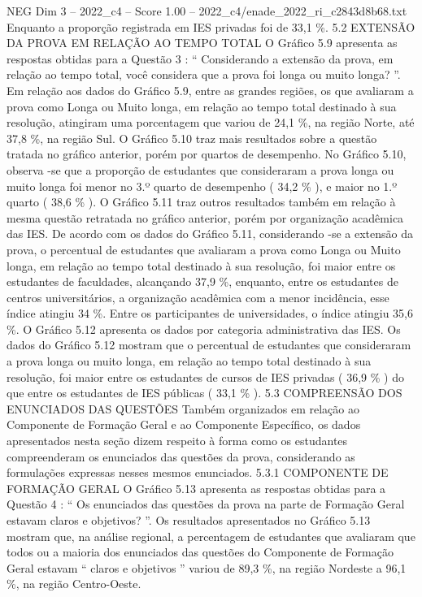 \begin{textsample}{NEG Dim 3 – 2022\_c4 – Score 1.00 – 2022\_c4/enade\_2022\_ri\_c2843d8b68.txt}
Enquanto a proporção registrada em IES privadas foi de 33,1 \%. 5.2 EXTENSÃO DA PROVA EM RELAÇÃO AO TEMPO TOTAL O Gráfico 5.9 apresenta as respostas obtidas para a Questão 3 : “ Considerando a extensão da prova, em relação ao tempo total, você considera que a prova foi longa ou muito longa? ”.
Em relação aos dados do Gráfico 5.9, entre as grandes regiões, os que avaliaram a prova como Longa ou Muito longa, em relação ao tempo total destinado à sua resolução, atingiram uma porcentagem que variou de 24,1 \%, na região Norte, até 37,8 \%, na região Sul.
O Gráfico 5.10 traz mais resultados sobre a questão tratada no gráfico anterior, porém por quartos de desempenho.
No Gráfico 5.10, observa -se que a proporção de estudantes que consideraram a prova longa ou muito longa foi menor no 3.º quarto de desempenho ( 34,2 \% ), e maior no 1.º quarto ( 38,6 \% ).
O Gráfico 5.11 traz outros resultados também em relação à mesma questão retratada no gráfico anterior, porém por organização acadêmica das IES.
De acordo com os dados do Gráfico 5.11, considerando -se a extensão da prova, o percentual de estudantes que avaliaram a prova como Longa ou Muito longa, em relação ao tempo total destinado à sua resolução, foi maior entre os estudantes de faculdades, alcançando 37,9 \%, enquanto, entre os estudantes de centros universitários, a organização acadêmica com a menor incidência, esse índice atingiu 34 \%.
Entre os participantes de universidades, o índice atingiu 35,6 \%.
O Gráfico 5.12 apresenta os dados por categoria administrativa das IES.
Os dados do Gráfico 5.12 mostram que o percentual de estudantes que consideraram a prova longa ou muito longa, em relação ao tempo total destinado à sua resolução, foi maior entre os estudantes de cursos de IES privadas ( 36,9 \% ) do que entre os estudantes de IES públicas ( 33,1 \% ). 5.3 COMPREENSÃO DOS ENUNCIADOS DAS QUESTÕES Também organizados em relação ao Componente de Formação Geral e ao Componente Específico, os dados apresentados nesta seção dizem respeito à forma como os estudantes compreenderam os enunciados das questões da prova, considerando as formulações expressas nesses mesmos enunciados. 5.3.1 COMPONENTE DE FORMAÇÃO GERAL O Gráfico 5.13 apresenta as respostas obtidas para a Questão 4 : “ Os enunciados das questões da prova na parte de Formação Geral estavam claros e objetivos? ”.
Os resultados apresentados no Gráfico 5.13 mostram que, na análise regional, a percentagem de estudantes que avaliaram que todos ou a maioria dos enunciados das questões do Componente de Formação Geral estavam “ claros e objetivos ” variou de 89,3 \%, na região Nordeste a 96,1 \%, na região Centro-Oeste.

\end{textsample}
